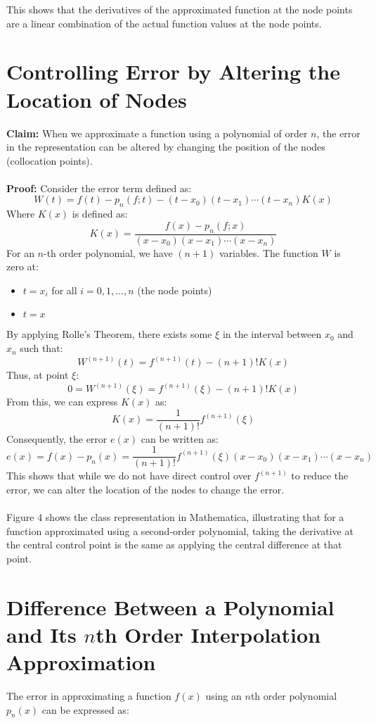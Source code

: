 \documentclass[12pt]{report} %
\begin{document}
This shows that the derivatives of the approximated function at the node points are a linear combination of the actual function values at the node points.

\section{Controlling Error by Altering the Location of Nodes}
\textbf{Claim:} When we approximate a function using a polynomial of order \( n \), the error in the representation can be altered by changing the position of the nodes (collocation points).\\\\
\textbf{Proof:} Consider the error term defined as:
\[
W(t) = f(t) - p_n(f; t) - (t - x_0)(t - x_1) \cdots (t - x_n) K(x)
\]
Where \( K(x) \) is defined as:
\[
K(x) = \frac{f(x) - p_n(f; x)}{(x - x_0)(x - x_1) \cdots (x - x_n)}
\]
For an \( n \)-th order polynomial, we have \( (n + 1) \) variables. The function \( W \) is zero at:
\begin{itemize}
    \item \( t = x_i \) for all \( i = 0, 1, \ldots, n \) (the node points)
    \item \( t = x \)
\end{itemize}

By applying Rolle’s Theorem, there exists some \( \xi \) in the interval between \( x_0 \) and \( x_n \) such that:
\[
W^{(n+1)}(t) = f^{(n+1)}(t) - (n + 1)! K(x)
\]
Thus, at point \( \xi \):
\[
0 = W^{(n+1)}(\xi) = f^{(n+1)}(\xi) - (n + 1)! K(x)
\]
From this, we can express \( K(x) \) as:
\[
K(x) = \frac{1}{(n + 1)!} f^{(n+1)}(\xi)
\]
Consequently, the error \( e(x) \) can be written as:
\[
e(x) = f(x) - p_n(x) = \frac{1}{(n + 1)!} f^{(n+1)}(\xi) (x - x_0)(x - x_1) \cdots (x - x_n)
\]
This shows that while we do not have direct control over \( f^{(n+1)} \) to reduce the error, we can alter the location of the nodes to change the error. \\\\
Figure 4 shows the class representation in Mathematica, illustrating that for a function approximated using a second-order polynomial, taking the derivative at the central control point is the same as applying the central difference at that point.

\section{Difference Between a Polynomial and Its \( n \)th Order Interpolation Approximation}
The error in approximating a function \( f(x) \) using an \( n \)th order polynomial \( p_n(x) \) can be expressed as:
\end{document}
